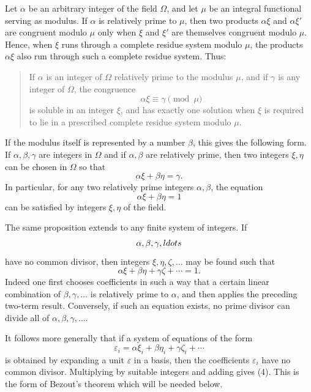 \documentclass[11pt,a4paper]{book}
\begin{document}
Let \(\alpha\) be an arbitrary integer of the field \(\Omega\), and let \(\mu\) be an integral functional serving as modulus.  If \(\alpha\) is relatively prime to \(\mu\), then two products \(\alpha\xi\) and \(\alpha\xi'\) are congruent modulo \(\mu\) only when \(\xi\) and \(\xi'\) are themselves congruent modulo \(\mu\).  Hence, when \(\xi\) runs through a complete residue system modulo \(\mu\), the products \(\alpha\xi\) also run through such a complete residue system.  Thus:

\begin{quote}
If \(\alpha\) is an integer of \(\Omega\) relatively prime to the modulus \(\mu\), and if \(\gamma\) is any integer of \(\Omega\), the congruence
\begin{equation}
 \alpha \xi \equiv \gamma \pmod{\mu} \tag{1}
\end{equation}
is soluble in an integer \(\xi\), and has exactly one solution when \(\xi\) is required to lie in a prescribed complete residue system modulo \(\mu\).
\end{quote}

If the modulus itself is represented by a number \(\beta\), this gives the following form.  If \(\alpha,\beta,\gamma\) are integers in \(\Omega\) and if \(\alpha,\beta\) are relatively prime, then two integers \(\xi,\eta\) can be chosen in \(\Omega\) so that
\begin{equation}
 \alpha\xi+\beta\eta=\gamma. \tag{2}
\end{equation}
In particular, for any two relatively prime integers \(\alpha,\beta\), the equation
\begin{equation}
 \alpha\xi+\beta\eta=1 \tag{3}
\end{equation}
can be satisfied by integers \(\xi,\eta\) of the field.

The same proposition extends to any finite system of integers.  If
\[
 \alpha,\beta,\gamma,\\ldots
\]
have no common divisor, then integers \(\xi,\eta,\zeta,
\ldots\) may be found such that
\begin{equation}
 \alpha\xi+\beta\eta+\gamma\zeta+\cdots=1. \tag{4}
\end{equation}
Indeed one first chooses coefficients in such a way that a certain linear combination of \(\beta,\gamma,\ldots\) is relatively prime to \(\alpha\), and then applies the preceding two-term result.  Conversely, if such an equation exists, no prime divisor can divide all of \(\alpha,\beta,\gamma,
\ldots\).

It follows more generally that if a system of equations of the form
\begin{equation}
 \varepsilon_i = \alpha\xi_i+\beta\eta_i+
\gamma\zeta_i+
\cdots \tag{5}
\end{equation}
is obtained by expanding a unit \(\varepsilon\) in a basis, then the coefficients \(\varepsilon_i\) have no common divisor.  Multiplying by suitable integers and adding gives (4).  This is the form of Bezout's theorem which will be needed below.
\end{document}

